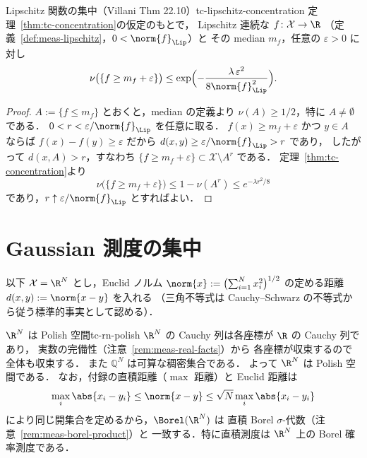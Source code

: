 \begin{corollary}{Lipschitz 関数の集中（Villani Thm 22.10）}{tc-lipschitz-concentration}
  定理~\ref{thm:tc-concentration}の仮定のもとで，
  Lipschitz 連続な $f\colon\mathcal{X}\to\R$
  （定義~\ref{def:meas-lipschitz}，$0<\norm{f}_{\Lip}$）と
  その median $m_f$，任意の $\varepsilon>0$ に対し
  \[
    \nu\bigl(\{f\geq m_f+\varepsilon\}\bigr)
    \leq\exp\Bigl(-\frac{\lambda\,\varepsilon^2}
    {8\norm{f}_{\Lip}^2}\Bigr).
  \]
\end{corollary}

\begin{proof}
  $A:=\{f\leq m_f\}$ とおくと，median の定義より
  $\nu(A)\geq1/2$，特に $A\neq\emptyset$ である．
  $0<r<\varepsilon/\norm{f}_{\Lip}$ を任意に取る．
  $f(x)\geq m_f+\varepsilon$ かつ $y\in A$ ならば
  $f(x)-f(y)\geq\varepsilon$ だから
  $d(x,y)\geq\varepsilon/\norm{f}_{\Lip}>r$ であり，
  したがって $d(x,A)>r$，すなわち
  $\{f\geq m_f+\varepsilon\}\subset\mathcal{X}\setminus A^r$ である．
  定理~\ref{thm:tc-concentration}より
  \[
    \nu\bigl(\{f\geq m_f+\varepsilon\}\bigr)
    \leq1-\nu(A^r)\leq e^{-\lambda r^2/8}
  \]
  であり，$r\uparrow\varepsilon/\norm{f}_{\Lip}$ とすればよい．
\end{proof}

\section{Gaussian 測度の集中}
\label{sec:tc-gaussian}

以下 $\mathcal{X}=\R^N$ とし，Euclid ノルム
$\norm{x}:=\bigl(\sum_{i=1}^Nx_i^2\bigr)^{1/2}$ の定める距離
$d(x,y):=\norm{x-y}$ を入れる
（三角不等式は Cauchy--Schwarz の不等式から従う標準的事実として認める）．

\begin{remark}{$\R^N$ は Polish 空間}{tc-rn-polish}
  $\R^N$ の Cauchy 列は各座標が $\R$ の Cauchy 列であり，
  実数の完備性（注意~\ref{rem:meas-real-facts}）から
  各座標が収束するので全体も収束する．
  また $\mathbb{Q}^N$ は可算な稠密集合である．
  よって $\R^N$ は Polish 空間である．
  なお，付録の直積距離（$\max$ 距離）と Euclid 距離は
  \[
    \max_i\abs{x_i-y_i}\leq\norm{x-y}\leq\sqrt{N}\max_i\abs{x_i-y_i}
  \]
  により同じ開集合を定めるから，$\Borel(\R^N)$ は
  直積 Borel $\sigma$-代数（注意~\ref{rem:meas-borel-product}）と
  一致する．特に直積測度は $\R^N$ 上の Borel 確率測度である．
\end{remark}

